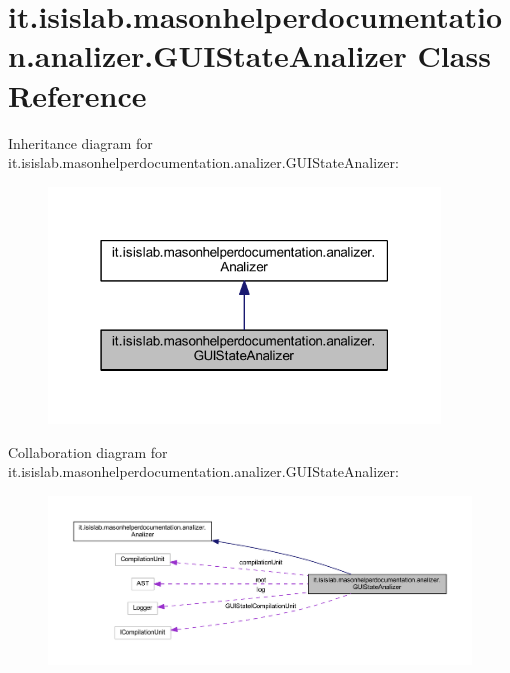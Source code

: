 \hypertarget{classit_1_1isislab_1_1masonhelperdocumentation_1_1analizer_1_1_g_u_i_state_analizer}{\section{it.\-isislab.\-masonhelperdocumentation.\-analizer.\-G\-U\-I\-State\-Analizer Class Reference}
\label{classit_1_1isislab_1_1masonhelperdocumentation_1_1analizer_1_1_g_u_i_state_analizer}
}


Inheritance diagram for it.\-isislab.\-masonhelperdocumentation.\-analizer.\-G\-U\-I\-State\-Analizer\-:\nopagebreak
\begin{figure}[H]
\begin{center}
\leavevmode
\includegraphics[width=295pt]{classit_1_1isislab_1_1masonhelperdocumentation_1_1analizer_1_1_g_u_i_state_analizer__inherit__graph}
\end{center}
\end{figure}


Collaboration diagram for it.\-isislab.\-masonhelperdocumentation.\-analizer.\-G\-U\-I\-State\-Analizer\-:\nopagebreak
\begin{figure}[H]
\begin{center}
\leavevmode
\includegraphics[width=350pt]{classit_1_1isislab_1_1masonhelperdocumentation_1_1analizer_1_1_g_u_i_state_analizer__coll__graph}
\end{center}
\end{figure}
